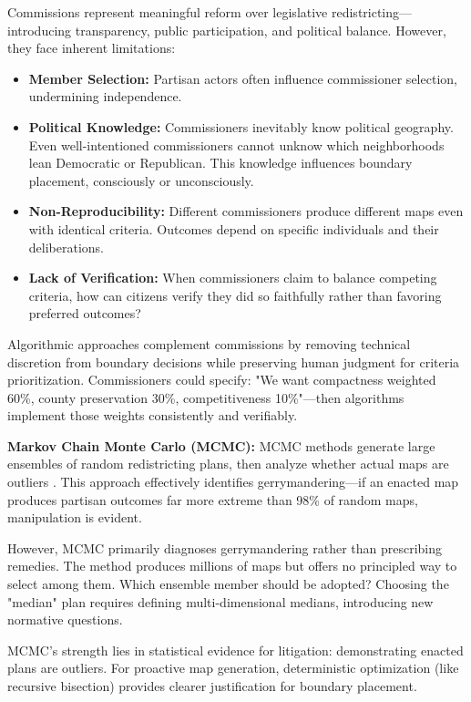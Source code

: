 Commissions represent meaningful reform over legislative redistricting—introducing transparency, public participation, and political balance. However, they face inherent limitations:

\begin{itemize}
    \item \textbf{Member Selection:} Partisan actors often influence commissioner selection, undermining independence.
    \item \textbf{Political Knowledge:} Commissioners inevitably know political geography. Even well-intentioned commissioners cannot unknow which neighborhoods lean Democratic or Republican. This knowledge influences boundary placement, consciously or unconsciously.
    \item \textbf{Non-Reproducibility:} Different commissioners produce different maps even with identical criteria. Outcomes depend on specific individuals and their deliberations.
    \item \textbf{Lack of Verification:} When commissioners claim to balance competing criteria, how can citizens verify they did so faithfully rather than favoring preferred outcomes?
\end{itemize}

Algorithmic approaches complement commissions by removing technical discretion from boundary decisions while preserving human judgment for criteria prioritization. Commissioners could specify: "We want compactness weighted 60\%, county preservation 30\%, competitiveness 10\%"—then algorithms implement those weights consistently and verifiably.

\textbf{Markov Chain Monte Carlo (MCMC):} MCMC methods generate large ensembles of random redistricting plans, then analyze whether actual maps are outliers \cite{fifield2020automated}. This approach effectively identifies gerrymandering—if an enacted map produces partisan outcomes far more extreme than 98\% of random maps, manipulation is evident.

However, MCMC primarily diagnoses gerrymandering rather than prescribing remedies. The method produces millions of maps but offers no principled way to select among them. Which ensemble member should be adopted? Choosing the "median" plan requires defining multi-dimensional medians, introducing new normative questions.

MCMC's strength lies in statistical evidence for litigation: demonstrating enacted plans are outliers. For proactive map generation, deterministic optimization (like recursive bisection) provides clearer justification for boundary placement.

